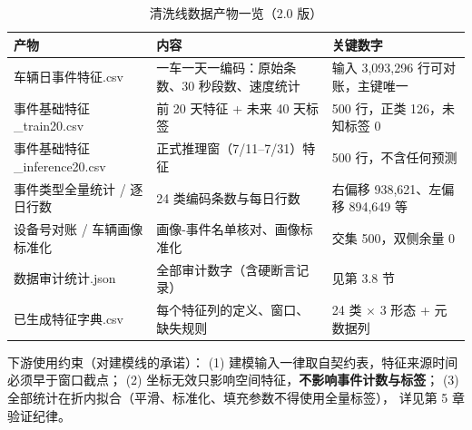 \begin{table}[H]
\centering
\caption{清洗线数据产物一览（2.0 版）}
\label{tab:products}
\small
\begin{tabularx}{\textwidth}{lLL}
\toprule
产物 & 内容 & 关键数字 \\
\midrule
车辆日事件特征.csv & 一车一天一编码：原始条数、30 秒段数、速度统计 & 输入 3{,}093{,}296 行可对账，主键唯一 \\
事件基础特征\_train20.csv & 前 20 天特征 + 未来 40 天标签 & 500 行，正类 126，未知标签 0 \\
事件基础特征\_inference20.csv & 正式推理窗（7/11--7/31）特征 & 500 行，不含任何预测 \\
事件类型全量统计 / 逐日行数 & 24 类编码条数与每日行数 & 右偏移 938{,}621、左偏移 894{,}649 等 \\
设备号对账 / 车辆画像标准化 & 画像-事件名单核对、画像标准化 & 交集 500，双侧余量 0 \\
数据审计统计.json & 全部审计数字（含硬断言记录） & 见第 3.8 节 \\
已生成特征字典.csv & 每个特征列的定义、窗口、缺失规则 & 24 类 $\times$ 3 形态 + 元数据列 \\
\bottomrule
\end{tabularx}
\end{table}

\noindent 下游使用约束（对建模线的承诺）：
(1) 建模输入一律取自契约表，特征来源时间必须早于窗口截点；
(2) 坐标无效只影响空间特征，\textbf{不影响事件计数与标签}；
(3) 全部统计在折内拟合（平滑、标准化、填充参数不得使用全量标签），
详见第 5 章验证纪律。
